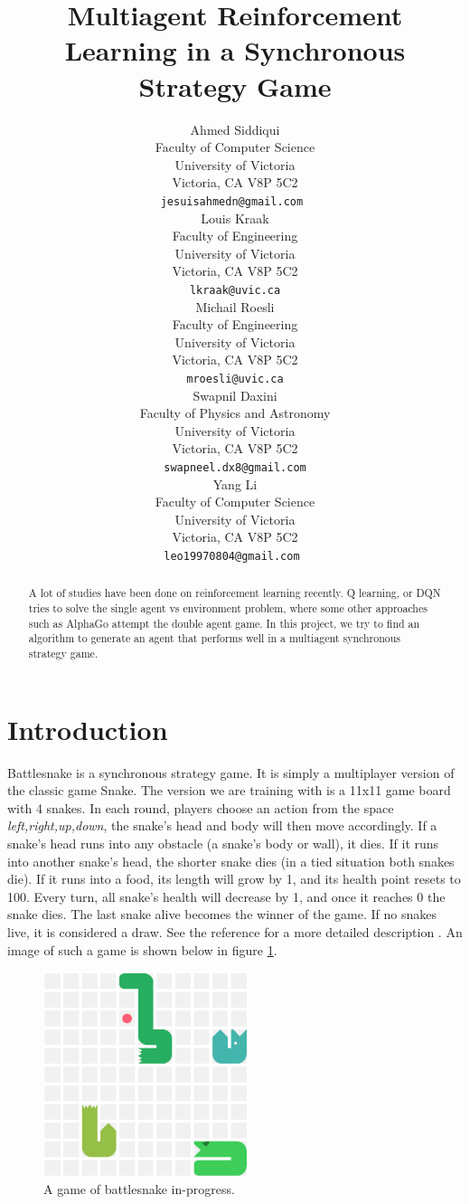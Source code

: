 \documentclass{article}
\title{Multiagent Reinforcement Learning in a Synchronous Strategy Game}
\author{%
  Ahmed Siddiqui \\
  Faculty of Computer Science\\
  University of Victoria\\
  Victoria, CA V8P 5C2 \\
  \texttt{jesuisahmedn@gmail.com } \\
  \And
  Louis Kraak  \\
  Faculty of Engineering \\
  University of Victoria \\
  Victoria, CA V8P 5C2 \\
  \texttt{lkraak@uvic.ca} \\
  \And
  Michail Roesli  \\
  Faculty of Engineering \\
  University of Victoria \\
  Victoria, CA V8P 5C2 \\
  \texttt{mroesli@uvic.ca} \\
  \And
  Swapnil Daxini  \\
  Faculty of Physics and Astronomy \\
  University of Victoria \\
  Victoria, CA V8P 5C2 \\
  \texttt{swapneel.dx8@gmail.com} \\
  \And
  Yang Li  \\
  Faculty of Computer Science \\
  University of Victoria \\
  Victoria, CA V8P 5C2 \\
  \texttt{leo19970804@gmail.com } \\
}
\begin{document}
\maketitle

\begin{abstract}
  A lot of studies have been done on reinforcement learning recently. Q
  learning, or DQN tries to solve the single agent vs environment problem, where
  some other approaches such as AlphaGo attempt the double agent game. In this
  project, we try to find an algorithm to generate an agent that performs well
  in a multiagent synchronous strategy game.
\end{abstract}

\section{Introduction}

Battlesnake is a synchronous strategy game. It is simply a multiplayer version
of the classic game Snake. The version we are training with is a 11x11 game
board with 4 snakes. In each round, players choose an action from the space
\textit{left,right,up,down}, the snake's head and body will then move accordingly. If
a snake's head runs into any obstacle (a snake's body or wall), it dies. If it
runs into another snake's head, the shorter snake dies (in a tied situation both
snakes die). If it runs into a food, its length will grow by 1, and its health
point resets to 100. Every turn, all snake's health will decrease by 1, and once
it reaches 0 the snake dies. The last snake alive becomes the winner of the
game. If no snakes live, it is considered a draw. See the reference for a more
detailed description \cite{BattlesnakeDoc}. An image of such a game is shown
below in figure \ref{fig:snake}.


\begin{figure}[!ht]
  \centering
  \includegraphics[width=6cm]{snake}
  \caption{A game of battlesnake in-progress.}
  \label{fig:snake}
\end{figure}
\end{document}
